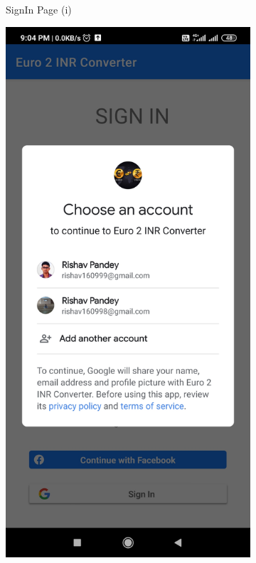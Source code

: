 \documentclass[12pt]{article}
\begin{document}
\begin{figure}[h]
\begin{subfigure}[h]{0.3\textwidth}
\caption{SignIn Page (i)}
\label{SignIn Page (i)}
\end{subfigure}
\hfill
\begin{subfigure}[h]{0.3\textwidth}
\centering
\includegraphics[scale=0.065]{146977794-37d93686-f927-4867-9725-8f424970e379.jpg}

\end{subfigure}
\end{figure}
\end{document}
